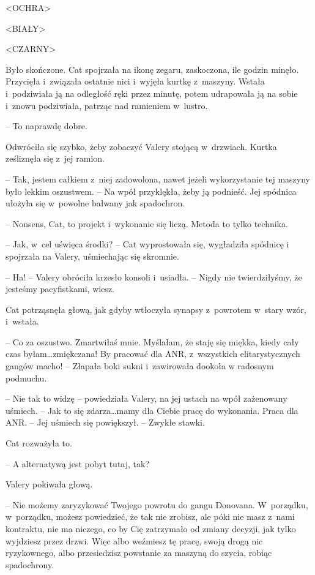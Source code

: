 \documentclass[oneside,polish,11pt,sfheadings]{mwbk}
\begin{document}
\textless{}OCHRA\textgreater{}

\textless{}BIAŁY\textgreater{}

\textless{}CZARNY\textgreater{}

Było skończone. Cat spojrzała na ikonę zegaru, zaskoczona, ile godzin
minęło. Przycięła i~związała ostatnie nici i~wyjęła kurtkę z~maszyny.
Wstała i~podziwiała ją na odległość ręki przez minutę, potem udrapowała
ją na sobie i~znowu podziwiała, patrząc nad ramieniem w~lustro.

-- To naprawdę dobre.

Odwróciła się szybko, żeby zobaczyć Valery stojącą w~drzwiach. Kurtka
ześliznęła się z~jej ramion.

-- Tak, jestem całkiem z~niej zadowolona, nawet jeżeli wykorzystanie tej
maszyny było lekkim oszustwem. -- Na wpół przyklękła, żeby ją podnieść.
Jej spódnica ułożyła się w~powolne bałwany jak spadochron.

-- Nonsens, Cat, to projekt i~wykonanie się liczą. Metoda to tylko
technika.

-- Jak, w~cel uświęca środki? -- Cat wyprostowała się, wygładziła spódnicę
i spojrzała na Valery, uśmiechając się skromnie.

-- Ha! -- Valery obróciła krzesło konsoli i~usiadła. -- Nigdy nie
twierdziłyśmy, że jesteśmy pacyfistkami, wiesz.

Cat potrząsnęła głową, jak gdyby wtłoczyła synapsy z~powrotem w~stary
wzór, i~wstała.

-- Co za oszustwo. Zmartwiłaś mnie. Myślałam, że staję się miękka, kiedy
cały czas byłam\ldots zmiękczana! By pracować dla ANR, z~wszystkich
elitarystycznych gangów macho! -- Złapała boki sukni i~zawirowała dookoła
w radosnym podmuchu.

-- Nie tak to widzę -- powiedziała Valery, na jej ustach na wpół
zażenowany uśmiech. -- Jak to się zdarza\ldots mamy dla Ciebie pracę do
wykonania. Praca dla ANR. -- Jej uśmiech się powiększył. -- Zwykłe stawki.

Cat rozważyła to. 

-- A alternatywą jest pobyt tutaj, tak?

Valery pokiwała głową. 

-- Nie możemy zaryzykować Twojego powrotu do gangu
Donovana. W~porządku, w~porządku, możesz powiedzieć, że tak nie zrobisz,
ale póki nie masz z~nami kontraktu, nie ma niczego, co by Cię zatrzymało
od zmiany decyzji, jak tylko wyjdziesz przez drzwi. Więc albo weźmiesz
tę pracę, swoją drogą nic ryzykownego, albo przesiedzisz powstanie za
maszyną do szycia, robiąc spadochrony.
\end{document}
